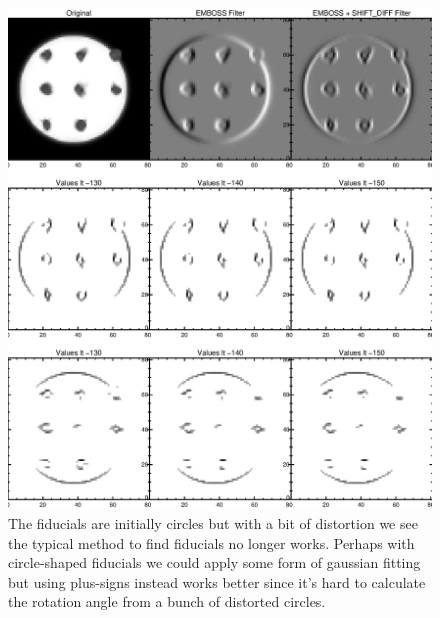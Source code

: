 \documentclass[10pt]{article}
\begin{document}
\begin{figure}
    \centering
    \includegraphics[width=.9\textwidth]{plots_tables_images/circfidcomp.eps}
    \caption{The fiducials are initially circles but with a bit of distortion we see the typical method to find fiducials no longer works. Perhaps with circle-shaped fiducials we could apply some form of gaussian fitting but using plus-signs instead works better since it's hard to calculate the rotation angle from a bunch of distorted circles.}
    \label{circfidcomp}
\end{figure}
\end{document}
